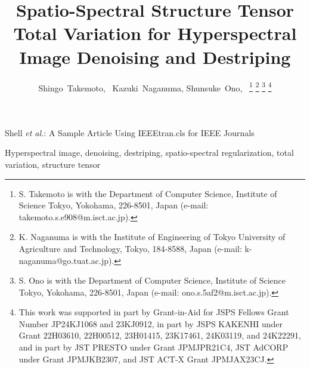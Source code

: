 \documentclass[10pt,journal]{IEEEtran}
\begin{document}

\title{Spatio-Spectral Structure Tensor Total Variation for Hyperspectral Image Denoising and Destriping}

\author{Shingo~Takemoto,~
        Kazuki~Naganuma, Shunsuke~Ono,~
\thanks{S. Takemoto is with the Department of Computer Science, Institute of Science Tokyo, Yokohama, 226-8501, Japan (e-mail: takemoto.s.e908@m.isct.ac.jp).}
\thanks{K. Naganuma is with the Institute of Engineering of Tokyo University of Agriculture and Technology, Tokyo, 184-8588, Japan (e-mail: k-naganuma@go.tuat.ac.jp).}
\thanks{S. Ono is with the Department of Computer Science, Institute of Science Tokyo, Yokohama, 226-8501, Japan (e-mail: ono.s.5af2@m.isct.ac.jp).}%
\thanks{This work was supported in part by Grant-in-Aid for JSPS Fellows Grant Number JP24KJ1068 and 23KJ0912, in part by JSPS KAKENHI under Grant 22H03610, 22H00512, 23H01415, 23K17461, 24K03119, and 24K22291, and in part by JST PRESTO under Grant JPMJPR21C4, JST AdCORP under Grant JPMJKB2307, and JST ACT-X Grant JPMJAX23CJ.}}


%
{Shell \MakeLowercase{\textit{et al.}}: A Sample Article Using IEEEtran.cls for IEEE Journals}


\maketitle



\begin{IEEEkeywords}
Hyperspectral image, denoising, destriping, spatio-spectral regularization, total variation, structure tensor
\end{IEEEkeywords}
\end{document}
